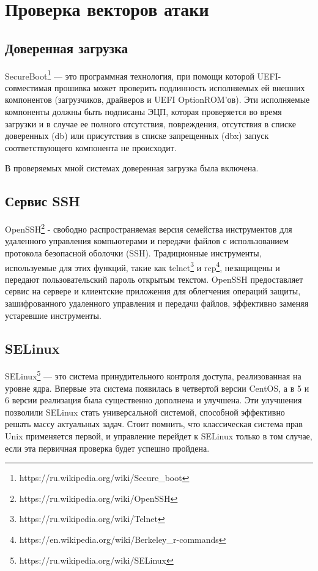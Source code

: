 \section{Проверка векторов атаки}

\subsection{Доверенная загрузка}

SecureBoot\footnote{https://ru.wikipedia.org/wiki/Secure\_boot} — это программная технология, при помощи которой UEFI-совместимая прошивка может проверить подлинность исполняемых ей внешних компонентов (загрузчиков, драйверов и UEFI OptionROM'ов). Эти исполняемые компоненты должны быть подписаны ЭЦП, которая проверяется во время загрузки и в случае ее полного отсутствия, повреждения, отсутствия в списке доверенных (db) или присутствия в списке запрещенных (dbx) запуск соответствующего компонента не происходит. 

В проверяемых мной системах доверенная загрузка была включена.

\subsection{Сервис SSH}

OpenSSH\footnote{https://ru.wikipedia.org/wiki/OpenSSH} - свободно распространяемая версия семейства инструментов для удаленного управления компьютерами и передачи файлов с использованием протокола безопасной оболочки (SSH). Традиционные инструменты, используемые для этих функций, такие как telnet\footnote{https://ru.wikipedia.org/wiki/Telnet} и rcp\footnote{https://en.wikipedia.org/wiki/Berkeley\_r-commands}, незащищены и передают пользовательский пароль открытым текстом. OpenSSH предоставляет сервис на сервере и клиентские приложения для облегчения операций защиты, зашифрованного удаленного управления и передачи файлов, эффективно заменяя устаревшие инструменты.

\subsection{SELinux}

SELinux\footnote{https://ru.wikipedia.org/wiki/SELinux} — это система принудительного контроля доступа, реализованная на уровне ядра. Впервые эта система появилась в четвертой версии CentOS, а в 5 и 6 версии реализация была существенно дополнена и улучшена. Эти улучшения позволили SELinux стать универсальной системой, способной эффективно решать массу актуальных задач. Стоит помнить, что классическая система прав Unix применяется первой, и управление перейдет к SELinux только в том случае, если эта первичная проверка будет успешно пройдена.



